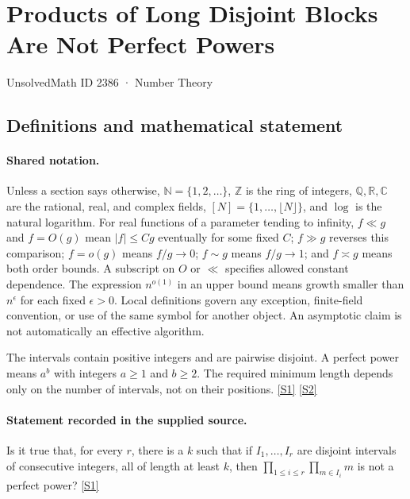 \documentclass[11pt,a4paper]{article}
\newcommand{\N}{\mathbb{N}}
\newcommand{\Z}{\mathbb{Z}}
\newcommand{\Q}{\mathbb{Q}}
\newcommand{\R}{\mathbb{R}}
\newcommand{\C}{\mathbb{C}}
\newcommand{\sref}[2]{\hyperlink{source:#1:#2}{[S#2]}}
\begin{document}

\setcounter{section}{2385}

\section{Products of Long Disjoint Blocks Are Not Perfect Powers}\label{2386}

{\small\sffamily UnsolvedMath ID 2386 · Number Theory}

\subsection{Definitions and mathematical statement}

\paragraph{Shared notation.}Unless a section says otherwise, $\N=\{1,2,\ldots\}$,
$\Z$ is the ring of integers, $\Q,\R,\C$ are the rational, real, and complex
fields, $[N]=\{1,\ldots,\lfloor N\rfloor\}$, and $\log$ is the natural
logarithm. For real functions of a parameter tending to infinity,
$f\ll g$ and $f=O(g)$ mean $|f|\leq Cg$ eventually for some fixed $C$;
$f\gg g$ reverses this comparison; $f=o(g)$ means $f/g\to0$;
$f\sim g$ means $f/g\to1$; and $f\asymp g$ means both order bounds.
A subscript on $O$ or $\ll$ specifies allowed constant dependence.
The expression $n^{o(1)}$ in an upper bound means growth smaller than
$n^\epsilon$ for each fixed $\epsilon>0$. Local definitions govern any
exception, finite-field convention, or use of the same symbol for another
object. An asymptotic claim is not automatically an effective algorithm.



The intervals contain positive integers and are pairwise disjoint. A perfect power means $a^b$ with integers $a\geq1$ and $b\geq2$. The required minimum length depends only on the number of intervals, not on their positions. \sref{2386}{1} \sref{2386}{2}

\paragraph{Statement recorded in the supplied source.}
Is it true that, for every $r$, there is a $k$ such that if $I_1,\ldots,I_r$ are disjoint intervals of consecutive integers, all of length at least $k$, then $ \prod_{1\leq i\leq r}\prod_{m\in I_i}m $ is not a perfect power? \sref{2386}{1}
\end{document}
